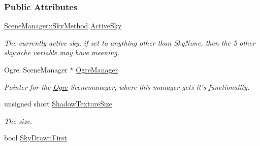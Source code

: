 \subsubsection*{Public Attributes}
\begin{DoxyCompactItemize}
\item 
\hypertarget{classMezzanine_1_1internal_1_1SceneManagerData_a13e182742dbeba04d7c5d13406b6a43f}{
\hyperlink{classMezzanine_1_1SceneManager_a80fac0c0b67191cb5450bddde74b470e}{SceneManager::SkyMethod} \hyperlink{classMezzanine_1_1internal_1_1SceneManagerData_a13e182742dbeba04d7c5d13406b6a43f}{ActiveSky}}
\label{classMezzanine_1_1internal_1_1SceneManagerData_a13e182742dbeba04d7c5d13406b6a43f}

\begin{DoxyCompactList}\small\item\em The currently active sky, if set to anything other than SkyNone, then the 5 other skycache variable may have meaning. \item\end{DoxyCompactList}\item 
\hypertarget{classMezzanine_1_1internal_1_1SceneManagerData_a04e6f2272890339328e3dac5faee0f41}{
Ogre::SceneManager $\ast$ \hyperlink{classMezzanine_1_1internal_1_1SceneManagerData_a04e6f2272890339328e3dac5faee0f41}{OgreManager}}
\label{classMezzanine_1_1internal_1_1SceneManagerData_a04e6f2272890339328e3dac5faee0f41}

\begin{DoxyCompactList}\small\item\em Pointer for the \hyperlink{namespaceOgre}{Ogre} Scenemanager, where this manager gets it's functionality. \item\end{DoxyCompactList}\item 
\hypertarget{classMezzanine_1_1internal_1_1SceneManagerData_ab4681b7cab84917a96bafb857870632e}{
unsigned short \hyperlink{classMezzanine_1_1internal_1_1SceneManagerData_ab4681b7cab84917a96bafb857870632e}{ShadowTextureSize}}
\label{classMezzanine_1_1internal_1_1SceneManagerData_ab4681b7cab84917a96bafb857870632e}

\begin{DoxyCompactList}\small\item\em The size. \item\end{DoxyCompactList}\item 
\hypertarget{classMezzanine_1_1internal_1_1SceneManagerData_adb50e162f7edf7dfc708cb3bf2d511bf}{
bool \hyperlink{classMezzanine_1_1internal_1_1SceneManagerData_adb50e162f7edf7dfc708cb3bf2d511bf}{SkyDrawnFirst}}
\label{classMezzanine_1_1internal_1_1SceneManagerData_adb50e162f7edf7dfc708cb3bf2d511bf}


\end{DoxyCompactItemize}

